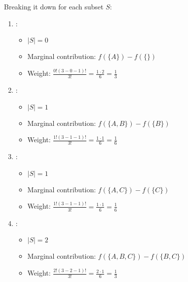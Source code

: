 \documentclass[letterpaper,10pt,english]{jupyterBook}
\begin{document}
\sphinxAtStartPar
Breaking it down for each subset \(S\):
\begin{enumerate}
%
\item {} 
\sphinxAtStartPar
{}:
\begin{itemize}
\item {} 
\sphinxAtStartPar
\(|S| = 0\)

\item {} 
\sphinxAtStartPar
Marginal contribution: \(f(\{A\}) - f(\{\})\)

\item {} 
\sphinxAtStartPar
Weight: \(\frac{0!(3-0-1)!}{3!} = \frac{1 \cdot 2}{6} = \frac{1}{3}\)

\end{itemize}

\item {} 
\sphinxAtStartPar
{}:
\begin{itemize}
\item {} 
\sphinxAtStartPar
\(|S| = 1\)

\item {} 
\sphinxAtStartPar
Marginal contribution: \(f(\{A, B\}) - f(\{B\})\)

\item {} 
\sphinxAtStartPar
Weight: \(\frac{1!(3-1-1)!}{3!} = \frac{1 \cdot 1}{6} = \frac{1}{6}\)

\end{itemize}

\item {} 
\sphinxAtStartPar
{}:
\begin{itemize}
\item {} 
\sphinxAtStartPar
\(|S| = 1\)

\item {} 
\sphinxAtStartPar
Marginal contribution: \(f(\{A, C\}) - f(\{C\})\)

\item {} 
\sphinxAtStartPar
Weight: \(\frac{1!(3-1-1)!}{3!} = \frac{1 \cdot 1}{6} = \frac{1}{6}\)

\end{itemize}

\item {} 
\sphinxAtStartPar
{}:
\begin{itemize}
\item {} 
\sphinxAtStartPar
\(|S| = 2\)

\item {} 
\sphinxAtStartPar
Marginal contribution: \(f(\{A, B, C\}) - f(\{B, C\})\)

\item {} 
\sphinxAtStartPar
Weight: \(\frac{2!(3-2-1)!}{3!} = \frac{2 \cdot 1}{6} = \frac{1}{3}\)

\end{itemize}

\end{enumerate}
\end{document}
